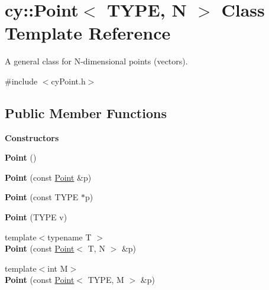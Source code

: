 \hypertarget{classcy_1_1_point}{}\section{cy\+::Point$<$ T\+Y\+PE, N $>$ Class Template Reference}
\label{classcy_1_1_point}


A general class for N-\/dimensional points (vectors).  




{\ttfamily \#include $<$cy\+Point.\+h$>$}

\subsection*{Public Member Functions}
\begin{Indent}\textbf{ Constructors}\par
\begin{DoxyCompactItemize}
\item 
\mbox{\label{classcy_1_1_point_a39449bcb4423a24470908b46808f5ef3}} 
{\bfseries Point} ()
\item 
\mbox{\label{classcy_1_1_point_a07b75925fdf47101b547c17c2ca05450}} 
{\bfseries Point} (const \mbox{\hyperlink{classcy_1_1_point}{Point}} \&p)
\item 
\mbox{\label{classcy_1_1_point_ab0ddac4849d3cb70ecbc25aa92c08bad}} 
{\bfseries Point} (const T\+Y\+PE $\ast$p)
\item 
\mbox{\label{classcy_1_1_point_a8d5f9cdae4a17ed55d5c87fd6461ca55}} 
{\bfseries Point} (T\+Y\+PE v)
\item 
\mbox{\label{classcy_1_1_point_a4a4bb40890aaa4bc4de71c6710ff12ea}} 
{\footnotesize template$<$typename T $>$ }\\{\bfseries Point} (const \mbox{\hyperlink{classcy_1_1_point}{Point}}$<$ T, N $>$ \&p)
\item 
\mbox{\label{classcy_1_1_point_a46201361c4eff91cb0f6f5b45205d5e7}} 
{\footnotesize template$<$int M$>$ }\\{\bfseries Point} (const \mbox{\hyperlink{classcy_1_1_point}{Point}}$<$ T\+Y\+PE, M $>$ \&p)
\item 

\end{DoxyCompactItemize}
\end{Indent}
